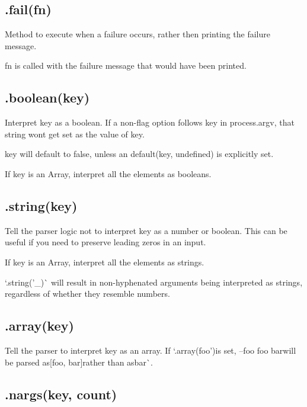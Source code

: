 \subsection*{.fail(fn) }

Method to execute when a failure occurs, rather then printing the failure message.

{\ttfamily fn} is called with the failure message that would have been printed.

\subsection*{.boolean(key) }

Interpret {\ttfamily key} as a boolean. If a non-\/flag option follows {\ttfamily key} in {\ttfamily process.\+argv}, that string won\textquotesingle{}t get set as the value of {\ttfamily key}.

{\ttfamily key} will default to {\ttfamily false}, unless an {\ttfamily default(key, undefined)} is explicitly set.

If {\ttfamily key} is an Array, interpret all the elements as booleans.

\subsection*{.string(key) }

Tell the parser logic not to interpret {\ttfamily key} as a number or boolean. This can be useful if you need to preserve leading zeros in an input.

If {\ttfamily key} is an Array, interpret all the elements as strings.

`.string('\+\_\+\textquotesingle{})\`{} will result in non-\/hyphenated arguments being interpreted as strings, regardless of whether they resemble numbers.

\subsection*{.array(key) }

Tell the parser to interpret {\ttfamily key} as an array. If `.array(\textquotesingle{}foo'){\ttfamily is set, }--foo foo bar{\ttfamily will be parsed as}\mbox{[}\textquotesingle{}foo\textquotesingle{}, \textquotesingle{}bar\textquotesingle{}\mbox{]}{\ttfamily rather than as}\textquotesingle{}bar\textquotesingle{}\`{}.

\subsection*{.nargs(key, count) }

